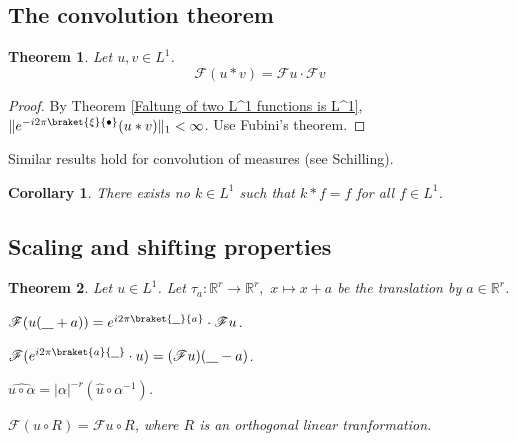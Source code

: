 \documentclass[11pt, a4paper, openany]{book}
\newtheorem{thm}{Theorem}\newtheorem{lem}{Lemma}\newtheorem{crl}{Corollary}
\theoremstyle{definition}
\newcommand{\ph}{\underline{\hspace{0.3cm}}}
\newcommand{\sph}{\underline{\hspace{0.2cm}}}
\newenvironment{tight_enumerate}{\begin{enumerate}\itemsep -0.2em}{\end{enumerate}}
\begin{document}
\subsection{The convolution theorem}
    \begin{thm}
        Let $u,v\in L^1$.
        \[
            \mathscr{F}(u*v)=\mathscr{F}u\cdot \mathscr{F}v
        \]
    \end{thm}
    \begin{proof}
        By Theorem \ref{Faltung of two L^1 functions is L^1}, $\|e^{-i2\pi\braket{\xi}{\bullet}}(u*v)\|_1<\infty$. Use Fubini's theorem.
    \end{proof}
    Similar results hold for convolution of measures (see Schilling).
    \begin{crl}
        There exists no $k\in L^1$ such that $k*f=f$ for all $f\in L^1$.
    \end{crl}
\subsection{Scaling and shifting properties}
    \begin{thm}
        Let $u\in L^1$. Let $\tau_a:\mathbb{R}^r\rightarrow \mathbb{R}^r,\,\,x\mapsto x+a$ be the translation by $a\in\mathbb{R}^r$. %
        \begin{tight_enumerate}
            \item $\mathscr{F}(u(\ph+a))=e^{i2\pi\braket{\sph}{a}}\cdot \mathscr{F}u$.
            \item $\mathscr{F}(e^{i2\pi\braket{a}{\sph}}\cdot u)=(\mathscr{F}u)(\ph-a)$.
            \item $\widehat{u\circ\alpha}=|\alpha|^{-r}(\widehat{u}\circ \alpha^{-1})$. %
            \item $\mathcal{F}(u\circ R)=\mathcal{F}u\circ R$, where $R$ is an orthogonal linear tranformation.
        \end{tight_enumerate}
    \end{thm}
\end{document}
